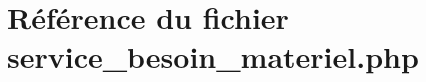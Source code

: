 \hypertarget{service__besoin__materiel_8php}{
\section{R\'{e}f\'{e}rence du fichier service\_\-besoin\_\-materiel.php}
\label{service__besoin__materiel_8php}
}
